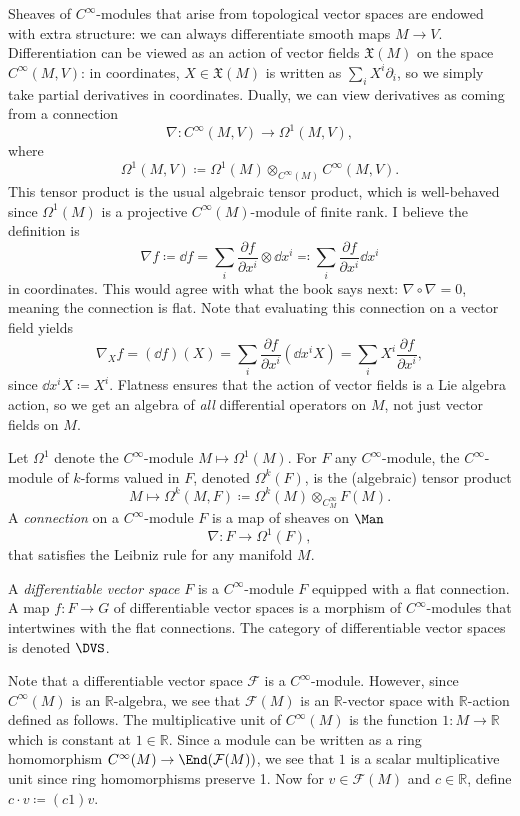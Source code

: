 Sheaves of $C^\infty $-modules that arise from topological vector spaces are endowed with extra structure: we can always differentiate smooth maps $M\to V$. Differentiation can be viewed as an action of vector fields $\mathfrak{X} (M)$ on the space $C^\infty (M,V)$: in coordinates, $X\in \mathfrak{X} (M)$ is written as $\sum_{i} X^i \partial _i$, so we simply take partial derivatives in coordinates. Dually, we can view derivatives as coming from a connection
\[
	\nabla : C^\infty (M,V) \to \Omega ^1(M,V)
,\]
where
\[
	\Omega ^1(M,V) \coloneqq \Omega ^1(M) \otimes _{C^\infty (M)} C^\infty (M,V)
.\]
This tensor product is the usual algebraic tensor product, which is well-behaved since $\Omega ^1(M)$ is a projective $C^\infty (M)$-module of finite rank. I believe the definition is
\[
	\nabla f\coloneqq \dd f = \sum_{i} \frac{\partial f}{\partial x^i} \otimes \dd x^i \eqqcolon \sum_{i} \frac{\partial f}{\partial x^i} \dd x^i
\]
in coordinates. This would agree with what the book says next: $\nabla \circ \nabla =0$, meaning the connection is flat. Note that evaluating this connection on a vector field yields
\[
	\nabla _Xf = (\dd f)(X) = \sum_{i} \frac{\partial f}{\partial x^i} (\dd x^iX)=\sum_{i} X^i \frac{\partial f}{\partial x^i} ,
\]
since $\dd x^iX \coloneqq X^i$. Flatness ensures that the action of vector fields is a Lie algebra action, so we get an algebra of \emph{all} differential operators on $M$, not just vector fields on $M$.
\begin{definition}\label{dfn:5-5-7}
	Let $\Omega ^1$ denote the $C^\infty $-module $M\mapsto \Omega ^1(M)$. For $F$ any $C^\infty $-module, the $C^\infty $-module of $k$-forms valued in $F$, denoted $\Omega ^k(F)$, is the (algebraic) tensor product
	\[
		M\mapsto \Omega ^{k} (M,F)\coloneqq \Omega ^k(M) \otimes _{C^\infty _M} F(M)
	.\]
	A \emph{connection} on a $C^\infty $-module $F$ is a map of sheaves on $\Man $
	\[
		\nabla : F \to \Omega ^1(F),
	\]
	that satisfies the Leibniz rule for any manifold $M$.

	A \emph{differentiable vector space} $F$ is a $C^\infty $-module $F$ equipped with a flat connection. A map $f : F \to G$ of differentiable vector spaces is a morphism of $C^\infty $-modules that intertwines with the flat connections. The category of differentiable vector spaces is denoted $\DVS $.
\end{definition}

Note that a differentiable vector space $\mathcal{F} $ is a $C^\infty $-module. However, since $C^\infty (M)$ is an $\mathbb{R} $-algebra, we see that $\mathcal{F} (M)$ is an $\mathbb{R} $-vector space with $\mathbb{R} $-action defined as follows. The multiplicative unit of $C^\infty (M)$ is the function $1: M \to \mathbb{R} $ which is constant at $1\in\mathbb{R} $. Since a module can be written as a ring homomorphism $C^\infty (M) \to \End(\mathcal{F} (M)) $, we see that $1$ is a scalar multiplicative unit since ring homomorphisms preserve 1. Now for $v\in \mathcal{F} (M)$ and $c\in\mathbb{R} $, define $c\cdot v \coloneqq (c1)v$.

